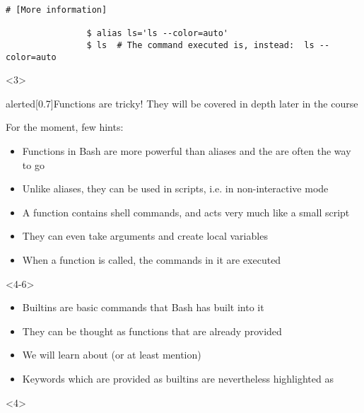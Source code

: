 \begin{frame}
\begin{overlayarea}{\textwidth}{0.7\textheight}
\begin{onlyenv}
\begin{lstlisting}[style=MyBash]
                # [More information]

                $ alias ls='ls --color=auto'
                $ ls  # The command executed is, instead:  ls --color=auto
            \end{lstlisting}
        \end{onlyenv}
        \begin{onlyenv}<3>
            {\Large
            \begin{varblock}{alerted}[0.7\textwidth]{Functions are tricky!}
                They will be covered in depth later in the course
            \end{varblock}}
            \bigskip
            For the moment, few hints:
            \begin{itemize}
                \item Functions in Bash are more powerful than aliases and the are often the way to go
                \item Unlike aliases, they can be used in scripts, i.e. in non-interactive mode
                \item A function contains shell commands, and acts very much like a small script
                \item They can even take arguments and create local variables
                \item When a function is called, the commands in it are executed
            \end{itemize}
        \end{onlyenv}
        \begin{onlyenv}<4-6>
            \begin{itemize}
                \item Builtins are basic commands that Bash has built into it
                \item They can be thought as functions that are already provided
                \item We will learn about (or at least mention) 
                \item Keywords which are provided as builtins are nevertheless highlighted as 
            \end{itemize}
            \begin{onlyenv}<4>
                \begin{lstlisting}[style=MyBash, numbers=none, keywordstyle=\color{builtins-color},]

\end{lstlisting}
\end{onlyenv}
\end{onlyenv}
\end{overlayarea}
\end{frame}
